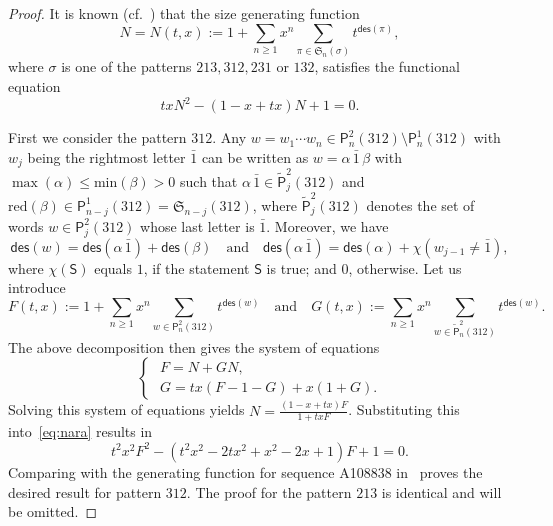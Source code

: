 \documentclass[12pt]{amsart} %
\numberwithin{equation}{section}
\theoremstyle{plain}
\theoremstyle{definition}
\renewcommand\P{\mathsf{P}}
\def\reduction{\mathrm{red}}
\def\max{\mathrm{max}}
\def\min{\mathrm{min}}
\def\des{\mathsf{des}}
\def\S{\mathfrak{S}}
\def\max{\operatorname{max}}
\def\neg#1{{{{\bar#1}}}}
\begin{document}
\begin{proof}
It is known (cf.~\cite[Sec.~2.3]{pe}) that the size generating function 
$$
N=N(t,x):=1+\sum_{n\geq1}x^n\sum_{\pi\in\S_n(\sigma)}t^{\des(\pi)},
$$
where $\sigma$ is one of the patterns $213,312,231$ or $132$, satisfies the functional equation 
\begin{equation}\label{eq:nara}
txN^2-(1-x+tx)N+1=0.
\end{equation}

First we consider the pattern $312$. Any $w=w_1\cdots w_n\in\P_n^2(312)\setminus\P_n^1(312)$ with $w_j$ being the rightmost letter $\neg1$  can be written as $w=\alpha\,\neg1\,\beta$ with $\max(\alpha)\leq \min(\beta)>0$ such that $\alpha\,\neg1\in\tilde{\P}_{j}^2(312)$ and $\reduction(\beta)\in\P_{n-j}^1(312)=\S_{n-j}(312)$, where $\tilde{\P}_j^2(312)$ denotes the set of words $w\in\P_j^2(312)$ whose last letter is $\neg1$. Moreover, we have 
$$
\des(w)=\des(\alpha\,\neg1)+\des(\beta)\quad\text{and}\quad\des(\alpha\,\neg1)=\des(\alpha)+\chi(w_{j-1}\neq\neg1),
$$
where $\chi(\mathsf{S})$ equals $1$, if the statement $\mathsf{S}$ is true; and $0$, otherwise. Let us introduce 
$$
F(t,x):=1+\sum_{n\geq1}x^n\sum_{w\in\P_n^2(312)}t^{\des(w)}\quad\text{and} \quad G(t,x):=\sum_{n\geq1}x^n\sum_{w\in\tilde{\P}_n^2(312)}t^{\des(w)}.
$$
 The above decomposition then gives the system of equations
$$
\begin{cases}
\,\,F=N+GN,
\\
\,\,G=tx(F-1-G)+x(1+G).
\end{cases}
$$
Solving this system of equations yields $N=\frac{(1-x+tx)F}{1+txF}$. Substituting this into~\eqref{eq:nara} results in
\begin{equation}\label{eq:312}
t^2x^2F^2-(t^2x^2-2tx^2+x^2-2x+1)F+1=0.
\end{equation}
Comparing with the generating function for sequence A108838 in~\cite{oeis} proves the desired result for pattern $312$. The proof for the pattern $213$ is identical and will be omitted. 


\end{proof}
\end{document}
